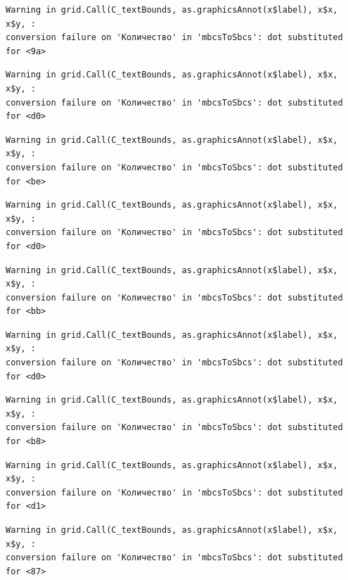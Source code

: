 \documentclass[
  letterpaper,
  DIV=11,
  numbers=noendperiod]{scrreprt}
\theoremstyle{definition}
\theoremstyle{remark}
\begin{document}
\begin{verbatim}
Warning in grid.Call(C_textBounds, as.graphicsAnnot(x$label), x$x, x$y, :
conversion failure on 'Количество' in 'mbcsToSbcs': dot substituted for <9a>
\end{verbatim}

\begin{verbatim}
Warning in grid.Call(C_textBounds, as.graphicsAnnot(x$label), x$x, x$y, :
conversion failure on 'Количество' in 'mbcsToSbcs': dot substituted for <d0>
\end{verbatim}

\begin{verbatim}
Warning in grid.Call(C_textBounds, as.graphicsAnnot(x$label), x$x, x$y, :
conversion failure on 'Количество' in 'mbcsToSbcs': dot substituted for <be>
\end{verbatim}

\begin{verbatim}
Warning in grid.Call(C_textBounds, as.graphicsAnnot(x$label), x$x, x$y, :
conversion failure on 'Количество' in 'mbcsToSbcs': dot substituted for <d0>
\end{verbatim}

\begin{verbatim}
Warning in grid.Call(C_textBounds, as.graphicsAnnot(x$label), x$x, x$y, :
conversion failure on 'Количество' in 'mbcsToSbcs': dot substituted for <bb>
\end{verbatim}

\begin{verbatim}
Warning in grid.Call(C_textBounds, as.graphicsAnnot(x$label), x$x, x$y, :
conversion failure on 'Количество' in 'mbcsToSbcs': dot substituted for <d0>
\end{verbatim}

\begin{verbatim}
Warning in grid.Call(C_textBounds, as.graphicsAnnot(x$label), x$x, x$y, :
conversion failure on 'Количество' in 'mbcsToSbcs': dot substituted for <b8>
\end{verbatim}

\begin{verbatim}
Warning in grid.Call(C_textBounds, as.graphicsAnnot(x$label), x$x, x$y, :
conversion failure on 'Количество' in 'mbcsToSbcs': dot substituted for <d1>
\end{verbatim}

\begin{verbatim}
Warning in grid.Call(C_textBounds, as.graphicsAnnot(x$label), x$x, x$y, :
conversion failure on 'Количество' in 'mbcsToSbcs': dot substituted for <87>
\end{verbatim}
\end{document}
